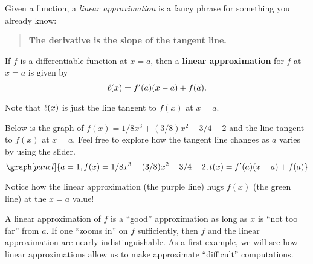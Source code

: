 \documentclass[handout,nooutcomes]{ximera}
\begin{document}
Given a function, a \textit{linear approximation} is a fancy phrase
for something you already know:
\begin{quote}
  \textbf{The derivative is the slope of the tangent line.}
\end{quote}


\begin{definition}
If $f$ is a differentiable function at $x=a$, then a \textbf{linear
  approximation} for $f$ at $x=a$ is given by
\[
\ell(x) = f'(a)(x-a) +f(a).
\]
\end{definition}


Note that $\ell(x)$ is just the line tangent to $f(x)$ at $x=a$.

\begin{example}
Below is the graph of $f(x) = 1/8x^3 + (3/8)x^2 -3/4 - 2$ and the line tangent to $f(x)$ at $x=a$. Feel free to explore how the tangent line changes as $a$ varies by using the slider.
\[
\graph[panel]{a=1, f(x) = 1/8x^3 + (3/8)x^2 -3/4 - 2, t(x) = f'(a)(x-a)+ f(a)}
\]

Notice how the linear approximation (the purple line) hugs
$f(x)$ (the green line) at the $x=a$ value!
\end{example}

A linear approximation of $f$ is a ``good'' approximation as long as
$x$ is ``not too far'' from $a.$
If one ``zooms in'' on $f$ sufficiently, then $f$ and the linear
approximation are nearly indistinguishable. As a first example, we
will see how linear approximations allow us to make approximate
``difficult'' computations.
\end{document}
